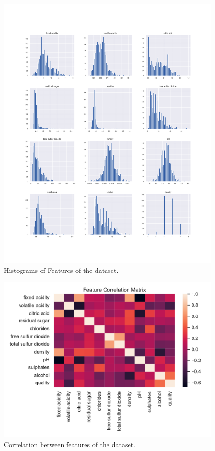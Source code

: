 \documentclass[english,notitlepage,reprint,nofootinbib]{revtex4-1}
\begin{document}
\begin{figure}[H]
	\centering
	\includegraphics[width=\linewidth]{data-visualisation.pdf}
	\caption{Histograms of Features of the dataset.}
	\label{fig:datavis}
\end{figure}


\begin{figure}[H]
	\centering
	\includegraphics[width=\linewidth]{feature-corr.pdf}
	\caption{Correlation between features of the dataset.}
	\label{fig:featcorr}
\end{figure}
\end{document}
